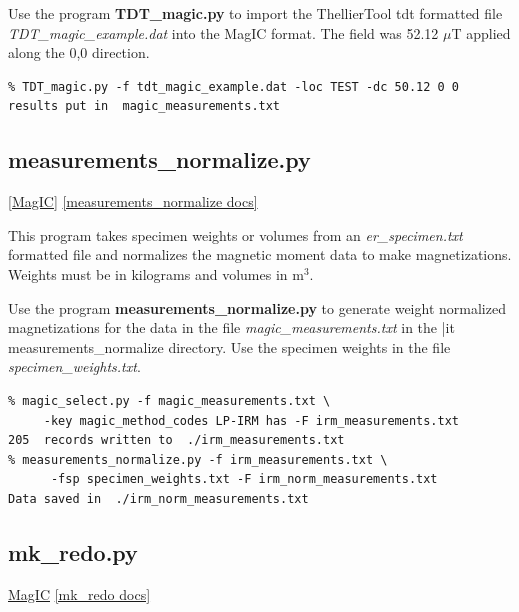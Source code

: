 \documentclass[11pt]{book}
\begin{document}
{{{Use the program {\bf TDT\_magic.py} to import the ThellierTool tdt formatted file  {\it TDT\_magic\_example.dat} into the MagIC format.   The field was 52.12 $\mu$T applied along the 0,0 direction.   

\begin{verbatim}
% TDT_magic.py -f tdt_magic_example.dat -loc TEST -dc 50.12 0 0
results put in  magic_measurements.txt
\end{verbatim}


\subsection{measurements\_normalize.py}
\href{#MagIC}{[MagIC]}
\href{http://earthref.org/PmagPy/pmagpydocs/measurements_normalize-module.html}{[measurements\_normalize docs]}

This program takes specimen weights or volumes from an {\it er\_specimen.txt} formatted file and normalizes the magnetic moment data to make  magnetizations.  Weights must be in kilograms and volumes in m$^3$.  

Use the program {\bf measurements\_normalize.py} to generate weight normalized magnetizations for the data in the file {\it magic\_measurements.txt} in the {|it measurements\_normalize} directory.  Use the specimen weights in the file {\it specimen\_weights.txt}.   

\begin{verbatim}
% magic_select.py -f magic_measurements.txt \
     -key magic_method_codes LP-IRM has -F irm_measurements.txt
205  records written to  ./irm_measurements.txt
% measurements_normalize.py -f irm_measurements.txt \
      -fsp specimen_weights.txt -F irm_norm_measurements.txt
Data saved in  ./irm_norm_measurements.txt
\end{verbatim}

\subsection{mk\_redo.py} 
\href{#MagIC}{MagIC}
\href{http://earthref.org/PmagPy/pmagpydocs/mk_redo-module.html}{[mk\_redo docs]}

}}}
\end{document}
